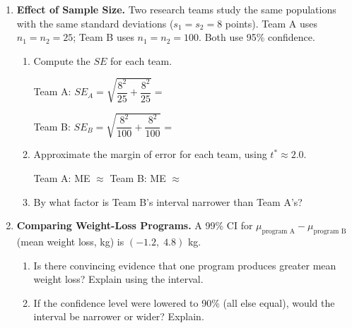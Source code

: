 \documentclass[10pt]{article}
\begin{document}
\begin{enumerate}
\vspace{0.06in}

\item \textbf{Effect of Sample Size.} \quad
Two research teams study the same populations with the same standard deviations
($s_1 = s_2 = 8$ points). Team A uses $n_1 = n_2 = 25$; Team B uses $n_1 = n_2 = 100$.
Both use 95\% confidence.

\begin{enumerate}[label=\alph*.]
  \item Compute the $SE$ for each team.

        Team A: $SE_A = \sqrt{\dfrac{8^2}{25} + \dfrac{8^2}{25}} = $ 

        Team B: $SE_B = \sqrt{\dfrac{8^2}{100} + \dfrac{8^2}{100}} = $ 

  \item Approximate the margin of error for each team, using $t^* \approx 2.0$.

        Team A: ME $\approx$  \qquad Team B: ME $\approx$ 

  \item By what factor is Team B's interval narrower than Team A's?
\end{enumerate}

\vspace{0.06in}

\item \textbf{Comparing Weight-Loss Programs.} \quad
A 99\% CI for $\mu_{\text{program A}} - \mu_{\text{program B}}$ (mean weight loss, kg) is
$(-1.2,\; 4.8)$ kg.

\begin{enumerate}[label=\alph*.]
  \item Is there convincing evidence that one program produces greater mean weight loss?
        Explain using the interval.
  \item If the confidence level were lowered to 90\% (all else equal), would the interval
        be narrower or wider? Explain.
\end{enumerate}

\end{enumerate}
\end{document}
